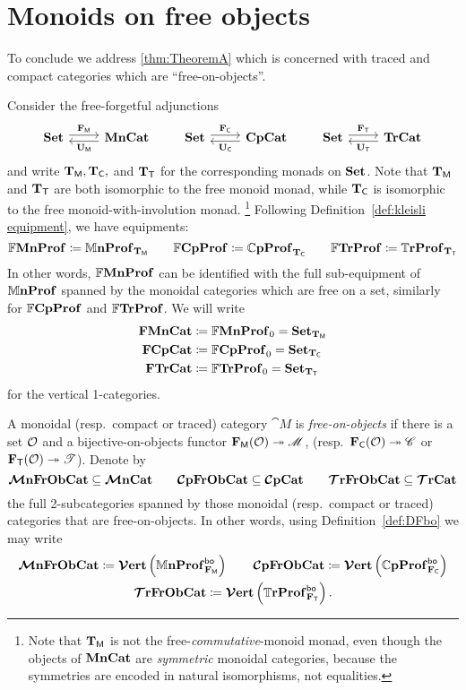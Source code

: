 \documentclass[11pt,oneside,article]{memoir}
\begin{document}
\section{Monoids on free objects}
      \label{sec:monoids_on_free}

To conclude we address \ref{thm:TheoremA} which is concerned with traced and compact categories which are ``free-on-objects''.

Consider the free-forgetful adjunctions
\begin{equation}
   \label{eqn:adjunctions}
   \Adjoint{\Set}{\MonCat}{\FM}{\UM}
   \qquad
   \Adjoint{\Set}{\CompCat}{\FC}{\UC}
   \qquad
   \Adjoint{\Set}{\TrCat}{\FT}{\UT}
\end{equation}
and write $\mathbf{T}_{\mathsf{M}},\mathbf{T}_{\mathsf{C}},$ and $\mathbf{T}_{\mathsf{T}}$ for the corresponding monads on $\mathbf{Set}$.  Note that $\mathbf{T}_{\mathsf{M}}$ and $\mathbf{T}_{\mathsf{T}}$ are both isomorphic to the free monoid monad, while $\mathbf{T}_{\mathsf{C}}$ is isomorphic to the free monoid-with-involution monad.%
\footnote{
   Note that $\mathbf{T}_{\mathsf{M}}$ is not the free-\emph{commutative}-monoid monad, even though the objects of
   $\mathbf{MnCat}$ are \emph{symmetric} monoidal categories, because the symmetries are encoded in natural
   isomorphisms, not equalities.
}
Following Definition~\ref{def:kleisli equipment}, we have equipments:
\[
   \mathbb{F}\mathbf{MnProf}  \coloneqq \mathbb{M}\mathbf{nProf}_{\mathbf{T}_{\mathsf{M}}}
   \qquad
   \mathbb{F}\mathbf{CpProf} \coloneqq \mathbb{C}\mathbf{pProf}_{\mathbf{T}_{\mathsf{C}}}
   \qquad
   \mathbb{F}\mathbf{TrProf}   \coloneqq \mathbb{T}\mathbf{rProf}_{\mathbf{T}_{\mathsf{T}}} 
\]
In other words, $\mathbb{F}\mathbf{MnProf}$ can be identified with the full sub-equipment of $\mathbb{M}\mathbf{nProf}$ spanned by the monoidal categories which are free on a set, similarly for $\mathbb{F}\mathbf{CpProf}$ and $\mathbb{F}\mathbf{TrProf}$.  We will write 
\begin{align*}
   \mathbf{FMnCat}&\coloneqq\mathbb{F}\mathbf{MnProf}_0=\mathbf{Set}_{\mathbf{T}_{\mathsf{M}}}\\
   \mathbf{FCpCat}&\coloneqq\mathbb{F}\mathbf{CpProf}_0=\mathbf{Set}_{\mathbf{T}_{\mathsf{C}}}\\
   \mathbf{FTrCat}&\coloneqq\mathbb{F}\mathbf{TrProf}_0=\mathbf{Set}_{\mathbf{T}_{\mathsf{T}}}
\end{align*}
for the vertical 1-categories.

\begin{definition}
      \label{def:free_on_objects}
   A monoidal (resp.\ compact or traced) category $\cat{M}$ is \emph{free-on-objects} if there is a
   set $\mathcal{O}$ and a bijective-on-objects functor $\mathbf{F}_{\mathsf{M}}(\mathcal{O})\twoheadrightarrow\mathscr{M}$, (resp.\
   $\mathbf{F}_{\mathsf{C}}(\mathcal{O})\twoheadrightarrow\mathscr{C}$ or $\mathbf{F}_{\mathsf{T}}(\mathcal{O})\twoheadrightarrow\mathscr{T}$). Denote by
   \[
      \bm{\mathcal{M}}\mathbf{nFrObCat}\subseteq\bm{\mathcal{M}}\mathbf{nCat}\qquad\bm{\mathcal{C}}\mathbf{pFrObCat}\subseteq\bm{\mathcal{C}}\mathbf{pCat}\qquad\bm{\mathcal{T}}\mathbf{rFrObCat}\subseteq\bm{\mathcal{T}}\mathbf{rCat}
   \]
   the full 2-subcategories spanned by those monoidal (resp.\ compact or traced) categories
   that are free-on-objects. In other words, using Definition~\ref{def:DFbo} we may write
   \begin{gather*}
      \bm{\mathcal{M}}\mathbf{nFrObCat} \coloneqq \bm{\mathcal{V}}\mathbf{ert}\left(\mathbb{M}\mathbf{nProf}_{\mathbf{F}_{\mathsf{M}}}^{\mathsf{bo}}\right) \qquad
      \bm{\mathcal{C}}\mathbf{pFrObCat} \coloneqq \bm{\mathcal{V}}\mathbf{ert}\left(\mathbb{C}\mathbf{pProf}_{\mathbf{F}_{\mathsf{C}}}^{\mathsf{bo}}\right) \\
      \bm{\mathcal{T}}\mathbf{rFrObCat} \coloneqq \bm{\mathcal{V}}\mathbf{ert}\left(\mathbb{T}\mathbf{rProf}_{\mathbf{F}_{\mathsf{T}}}^{\mathsf{bo}}\right).
   \end{gather*}
\end{definition}
\end{document}
